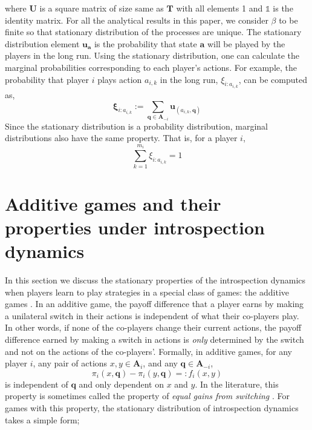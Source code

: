 \documentclass[11pt]{article}
\theoremstyle{plainCl1}
\theoremstyle{plainCl2}
\newcommand{\A}{\mathbf{A}}
\newcommand{\abf}{\mathbf{a}}
\newcommand{\qbf}{\mathbf{q}}
\newcommand{\T}{\mathbf{T}}
\newcommand{\ubf}{\mathbf{u}}
\begin{document}
where $\mathbf{U}$ is a square matrix of size same as $\T$ with all elements 1 and $\mathbb{1}$ is the identity matrix. For all the analytical results in this paper, we consider $\beta$ to be finite so that stationary distribution of the processes are unique. The stationary distribution element $\ubf_\abf$ is the probability that state $\abf$ will be played by the players in the long run. Using the stationary distribution, one can calculate the marginal probabilities corresponding to each player's actions. For example, the probability that player $i$ plays action $a_{i,k}$ in the long run, $\xi_{i:a_{i,k}}$, can be computed as,
\begin{equation}
\mathbf{\xi}_{i:a_{i,k}} := \sum_{\qbf \in \A_{-i}} \ubf_{(a_{i,k}, \qbf)}
\label{Eq:marginal-definition}
\end{equation}
\noindent Since the stationary distribution is a probability distribution, marginal distributions also have the same property. That is, for a player $i$, 
\begin{equation}
\sum_{k = 1}^{m_i} \xi_{i:a_{i,k}}= 1
\label{Eq:marginal-prob-dist}
\end{equation}
\section*{Additive games and their properties under introspection dynamics}
In this section we discuss the stationary properties of the introspection dynamics when players learn to play strategies in a special class of games: the additive games \cite{pena2014gains, mcavoy2015asymmetric}. In an additive game, the payoff difference that a player earns by making a unilateral switch in their actions is independent of what their co-players play. In other words, if none of the co-players change their current actions, the payoff difference earned by making a switch in actions is \emph{only} determined by the switch and not on the actions of the co-players'. Formally, in additive games, for any player $i$, any pair of actions $x,y \in \A_i$, and any $\qbf \in \A_{-i}$,
\begin{equation}
\pi_i(x, \qbf) - \pi_i(y, \qbf) =: f_i(x,y) 
\end{equation}
\noindent is independent of $\qbf$ and only dependent on $x$ and $y$. In the literature, this property is sometimes called the property of \emph{equal gains from switching} \cite{pena2014gains}. For games with this property, the stationary distribution of introspection dynamics takes a simple form;
\end{document}
